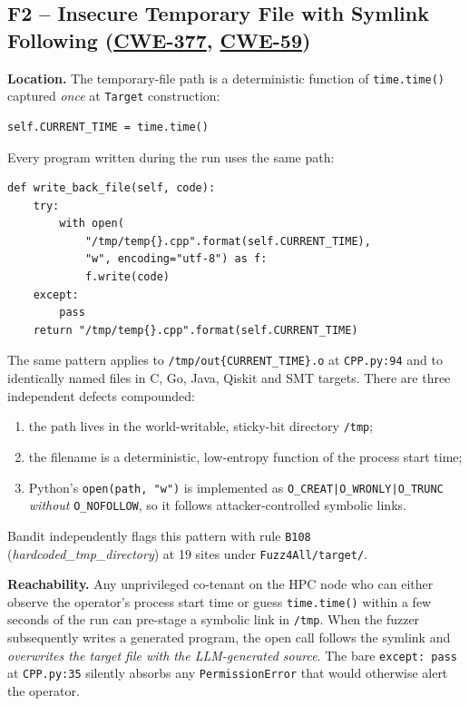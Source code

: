 \documentclass[conference]{IEEEtran}
\newcommand{\cwe}[1]{\href{https://cwe.mitre.org/data/definitions/#1.html}{CWE-#1}}
\begin{document}
\subsection{F2 -- Insecure Temporary File with Symlink Following
(\cwe{377}, \cwe{59})}

\textbf{Location.} The temporary-file path is a deterministic function of
\texttt{time.time()} captured \emph{once} at \texttt{Target}
construction:

\begin{lstlisting}[style=py,caption={Fuzz4All/target/target.py line 127.},
firstnumber=127]
self.CURRENT_TIME = time.time()
\end{lstlisting}

Every program written during the run uses the same path:

\begin{lstlisting}[style=py,caption={Fuzz4All/target/CPP/CPP.py lines 29--37.},firstnumber=29]
def write_back_file(self, code):
    try:
        with open(
            "/tmp/temp{}.cpp".format(self.CURRENT_TIME),
            "w", encoding="utf-8") as f:
            f.write(code)
    except:
        pass
    return "/tmp/temp{}.cpp".format(self.CURRENT_TIME)
\end{lstlisting}

The same pattern applies to \verb|/tmp/out{CURRENT_TIME}.o| at
\texttt{CPP.py:94} and to identically named files in C, Go, Java, Qiskit
and SMT targets. There are three independent defects compounded:
\begin{enumerate}[label=(\roman*),leftmargin=*]
\item the path lives in the world-writable, sticky-bit directory
\texttt{/tmp};
\item the filename is a deterministic, low-entropy function of the
process start time;
\item Python's \texttt{open(path, "w")} is implemented as
\texttt{O\_CREAT|O\_WRONLY|O\_TRUNC} \emph{without} \texttt{O\_NOFOLLOW},
so it follows attacker-controlled symbolic links.
\end{enumerate}
Bandit independently flags this pattern with rule \texttt{B108}
(\textit{hardcoded\_tmp\_directory}) at 19 sites under
\texttt{Fuzz4All/target/}.

\textbf{Reachability.} Any unprivileged co-tenant on the HPC node who can
either observe the operator's process start time or guess
\texttt{time.time()} within a few seconds of the run can pre-stage a
symbolic link in \texttt{/tmp}. When the fuzzer subsequently writes a
generated program, the open call follows the symlink and \emph{overwrites
the target file with the LLM-generated source}. The bare
\verb|except: pass| at \texttt{CPP.py:35} silently absorbs any
\texttt{PermissionError} that would otherwise alert the operator.
\end{document}
